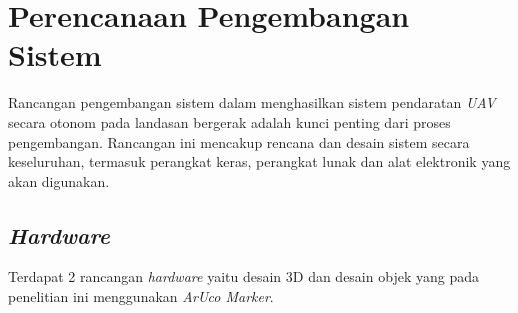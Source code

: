 \section{Perencanaan Pengembangan Sistem}
Rancangan pengembangan sistem dalam menghasilkan sistem pendaratan \textit{UAV} secara otonom pada landasan bergerak adalah kunci penting dari proses pengembangan. Rancangan ini mencakup rencana dan desain sistem secara keseluruhan, termasuk perangkat keras, perangkat lunak dan alat elektronik yang akan digunakan.

\subsection{\textit{Hardware}}
Terdapat 2 rancangan \textit{hardware} yaitu desain 3D dan desain objek yang pada penelitian ini menggunakan \textit{ArUco Marker}.
